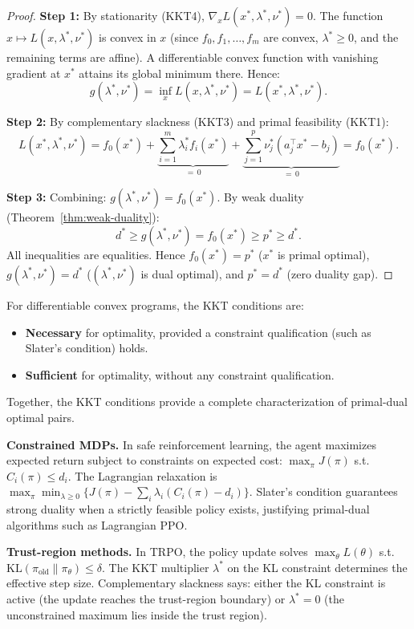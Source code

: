 \documentclass[11pt,a4paper]{article}
\begin{document}
\begin{proof}
\textbf{Step 1:} By stationarity (KKT4), $\nabla_x L(x^*, \lambda^*, \nu^*) = 0$.
The function $x \mapsto L(x, \lambda^*, \nu^*)$ is convex in $x$ (since
$f_0, f_1, \dots, f_m$ are convex, $\lambda^* \ge 0$, and the remaining
terms are affine). A differentiable convex function with vanishing gradient
at $x^*$ attains its global minimum there. Hence:
\begin{equation}\label{eq:suff-step1}
  g(\lambda^*, \nu^*) = \inf_x L(x, \lambda^*, \nu^*)
  = L(x^*, \lambda^*, \nu^*).
\end{equation}

\textbf{Step 2:} By complementary slackness (KKT3) and primal feasibility
(KKT1):
\begin{equation}\label{eq:suff-step2}
  L(x^*, \lambda^*, \nu^*) = f_0(x^*)
    + \underbrace{\sum_{i=1}^m \lambda^*_i f_i(x^*)}_{=\,0}
    + \underbrace{\sum_{j=1}^p \nu^*_j(a_j^\top x^* - b_j)}_{=\,0}
  = f_0(x^*).
\end{equation}

\textbf{Step 3:} Combining:
$g(\lambda^*, \nu^*) = f_0(x^*)$.
By weak duality (Theorem~\ref{thm:weak-duality}):
\[
  d^* \ge g(\lambda^*, \nu^*) = f_0(x^*) \ge p^* \ge d^*.
\]
All inequalities are equalities. Hence $f_0(x^*) = p^*$ ($x^*$ is primal
optimal), $g(\lambda^*, \nu^*) = d^*$ ($(\lambda^*, \nu^*)$ is dual optimal),
and $p^* = d^*$ (zero duality gap).
\end{proof}

\begin{keyresult}[title={KKT Conditions for Convex Problems}]
For differentiable convex programs, the KKT conditions are:
\begin{itemize}
  \item \textbf{Necessary} for optimality, provided a constraint qualification
    (such as Slater's condition) holds.
  \item \textbf{Sufficient} for optimality, without any constraint qualification.
\end{itemize}
Together, the KKT conditions provide a complete characterization of primal-dual
optimal pairs.
\end{keyresult}

\begin{rlconnection}
\textbf{Constrained MDPs.} In safe reinforcement learning, the agent maximizes
expected return subject to constraints on expected cost:
$\max_\pi J(\pi)$ s.t. $C_i(\pi) \le d_i$. The Lagrangian relaxation is
$\max_\pi \min_{\lambda \ge 0} \{J(\pi) - \sum_i \lambda_i (C_i(\pi) - d_i)\}$.
Slater's condition guarantees strong duality when a strictly feasible policy
exists, justifying primal-dual algorithms such as Lagrangian PPO.

\textbf{Trust-region methods.} In TRPO, the policy update solves
$\max_\theta L(\theta)$ s.t. $\text{KL}(\pi_{\text{old}} \| \pi_\theta) \le \delta$.
The KKT multiplier $\lambda^*$ on the KL constraint determines the effective
step size. Complementary slackness says: either the KL constraint is active
(the update reaches the trust-region boundary) or $\lambda^* = 0$ (the
unconstrained maximum lies inside the trust region).
\end{rlconnection}
\end{document}
